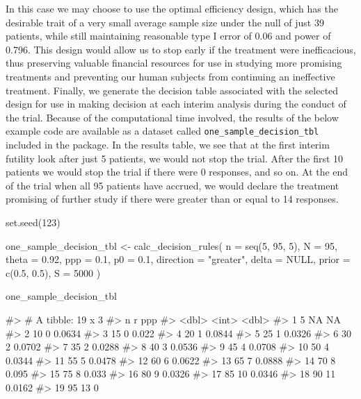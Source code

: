 In this case we may choose to use the optimal efficiency design, which
has the desirable trait of a very small average sample size under the
null of just 39 patients, while still maintaining reasonable type I
error of 0.06 and power of 0.796. This design would allow us to stop
early if the treatment were inefficacious, thus preserving valuable
financial resources for use in studying more promising treatments and
preventing our human subjects from continuing an ineffective treatment.
Finally, we generate the decision table associated with the selected
design for use in making decision at each interim analysis during the
conduct of the trial. Because of the computational time involved, the
results of the below example code are available as a dataset called
\texttt{one\_sample\_decision\_tbl} included in the 
package. In the results table, we see that at the first interim futility
look after just 5 patients, we would not stop the trial. After the first
10 patients we would stop the trial if there were 0 responses, and so
on. At the end of the trial when all 95 patients have accrued, we would
declare the treatment promising of further study if there were greater
than or equal to 14 responses.

\begin{Schunk}
\begin{Sinput}
set.seed(123)

one_sample_decision_tbl <- 
  calc_decision_rules(
    n = seq(5, 95, 5),
    N = 95, 
    theta = 0.92, 
    ppp = 0.1, 
    p0 = 0.1, 
    direction = "greater",
    delta = NULL, 
    prior = c(0.5, 0.5), 
    S = 5000
  )
\end{Sinput}
\end{Schunk}

\begin{Schunk}
\begin{Sinput}
one_sample_decision_tbl
\end{Sinput}
\begin{Soutput}
#> # A tibble: 19 x 3
#>        n     r     ppp
#>    <dbl> <int>   <dbl>
#>  1     5    NA NA     
#>  2    10     0  0.0634
#>  3    15     0  0.022 
#>  4    20     1  0.0844
#>  5    25     1  0.0326
#>  6    30     2  0.0702
#>  7    35     2  0.0288
#>  8    40     3  0.0536
#>  9    45     4  0.0708
#> 10    50     4  0.0344
#> 11    55     5  0.0478
#> 12    60     6  0.0622
#> 13    65     7  0.0888
#> 14    70     8  0.095 
#> 15    75     8  0.033 
#> 16    80     9  0.0326
#> 17    85    10  0.0346
#> 18    90    11  0.0162
#> 19    95    13  0
\end{Soutput}
\end{Schunk}

